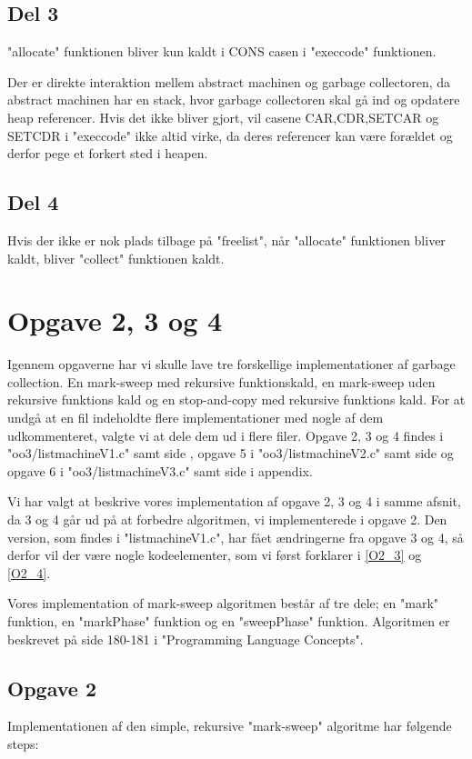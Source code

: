 \subsection{Del 3}
\label{O1_3}
"allocate" funktionen bliver kun kaldt i CONS casen i "execcode" funktionen.  

Der er direkte interaktion mellem abstract machinen og garbage collectoren, da abstract machinen har en stack, hvor garbage collectoren skal gå ind og opdatere heap referencer. Hvis det ikke bliver gjort, vil casene CAR,CDR,SETCAR og SETCDR i "execcode" ikke altid virke, da deres referencer kan være forældet og derfor pege et forkert sted i heapen. 

\subsection{Del 4}
\label{O1_4}
Hvis der ikke er nok plads tilbage på "freelist", når "allocate" funktionen bliver kaldt, bliver "collect" funktionen kaldt.

\section{Opgave 2, 3 og 4}
\label{O2}
Igennem opgaverne har vi skulle lave tre forskellige implementationer af garbage collection. En mark-sweep med rekursive funktionskald, en mark-sweep uden rekursive funktions kald og en stop-and-copy med rekursive funktions kald. For at undgå at en fil indeholdte flere implementationer med nogle af dem udkommenteret, valgte vi at dele dem ud i flere filer. Opgave 2, 3 og 4 findes i "oo3/listmachineV1.c" samt side \pageref{Code_V1}, opgave 5 i "oo3/listmachineV2.c" samt side \pageref{Code_V2} og opgave 6 i "oo3/listmachineV3.c" samt side \pageref{Code_V3} i appendix.

Vi har valgt at beskrive vores implementation af opgave 2, 3 og 4 i samme afsnit, da 3 og 4 går ud på at forbedre algoritmen, vi implementerede i opgave 2. Den version, som findes i "listmachineV1.c", har fået ændringerne fra opgave 3 og 4, så derfor vil der være nogle kodeelementer, som vi først forklarer i \ref{O2_3} og \ref{O2_4}.

Vores implementation of mark-sweep algoritmen består af tre dele; en "mark" funktion, en "markPhase" funktion og en "sweepPhase" funktion. Algoritmen er beskrevet på side 180-181 i "Programming Language Concepts".

\subsection{Opgave 2}
\label{O2_2}
Implementationen af den simple, rekursive "mark-sweep" algoritme har følgende steps:

